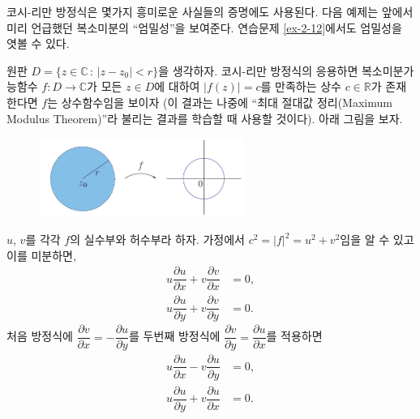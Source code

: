 코시-리만 방정식은 몇가지 흥미로운 사실들의 증명에도 사용된다.
다음 예제는 앞에서 미리 언급했던 복소미분의 ``엄밀성''을 보여준다.
연습문제 \ref{ex-2-12}에서도 엄밀성을 엿볼 수 있다.


\begin{salt_example}\label{example-2-11}
원판 $D=\{ z\in\mathbb C \,:\, |z-z_0| <r \}$을 생각하자.
코시-리만 방정식의 응용하면 복소미분가능함수 $f: D \to \mathbb C$가
모든 $z\in D$에 대하여 $|f(z)| =c$를 만족하는 상수 $c\in\mathbb R$가 
존재한다면 $f$는 상수함수임을 보이자 
(이 결과는 나중에 ``최대 절대값 정리(Maximum Modulus Theorem)''라 불리는 결과를
학습할 때 사용할 것이다).
아래 그림을 보자.

\begin{figure}[!h]
\begin{center}
\includegraphics[width=0.6\textwidth]{./SaltChapter/fig-2-0-2}
\end{center}
\end{figure}

$u$, $v$를 각각 $f$의 실수부와 허수부라 하자. 
가정에서 $c^2=|f|^2 = u^2 + v^2$임을 알 수 있고 이를 미분하면,
\begin{align*}
u\dfrac{\partial u}{\partial x} + v\dfrac{\partial v}{\partial x} &= 0, \\
u\dfrac{\partial u}{\partial y} + v\dfrac{\partial v}{\partial y} &= 0.
\end{align*}
처음 방정식에 $\dfrac{\partial v}{\partial x} = - \dfrac{\partial u}{\partial y}$를
두번째 방정식에 $\dfrac{\partial v}{\partial y} = \dfrac{\partial u}{\partial x}$를
적용하면
\begin{eqnarray}
u\dfrac{\partial u}{\partial x} - v\dfrac{\partial u}{\partial y} &= 0, \label{eq-2-8}\\
u\dfrac{\partial u}{\partial y} + v\dfrac{\partial u}{\partial x} &= 0. \label{eq-2-9}
\end{eqnarray}


\end{salt_example}
